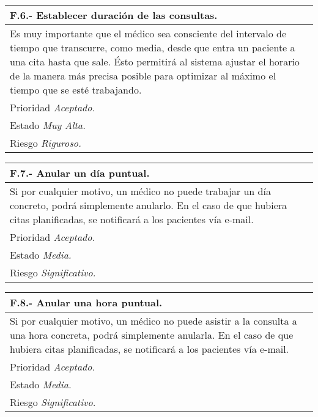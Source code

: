 \documentclass[a4paper,oneside,11pt]{book}
\begin{document}
\begin{center}
\begin{tabulary}{15cm}{|L|}
	\hline
		\bf{F.6.- Establecer duración de las consultas.} \\
	\hline
		Es muy importante que el médico sea consciente del intervalo de tiempo que transcurre, como media, desde que entra un paciente a una cita hasta que sale. Ésto permitirá al sistema ajustar el horario de la manera más precisa posible para optimizar al máximo el tiempo que se esté trabajando. \\
	\hline
		Prioridad \textit{Aceptado.} \\
	\hline
		Estado \textit{Muy Alta.} \\
	\hline
		Riesgo \textit{Riguroso.} \\
	\hline
\end{tabulary}
\end{center}

\begin{center}
\begin{tabulary}{15cm}{|L|}
	\hline
		\bf{F.7.- Anular un día puntual.} \\
	\hline
		Si por cualquier motivo, un médico no puede trabajar un día concreto, podrá simplemente anularlo. En el caso de que hubiera citas planificadas, se notificará a los pacientes vía e-mail. \\
	\hline
		Prioridad \textit{Aceptado.} \\
	\hline
		Estado \textit{Media.} \\
	\hline
		Riesgo \textit{Significativo.} \\
	\hline
\end{tabulary}
\end{center}

\begin{center}
\begin{tabulary}{15cm}{|L|}
	\hline
		\bf{F.8.- Anular una hora puntual.} \\
	\hline
		Si por cualquier motivo, un médico no puede asistir a la consulta a una hora concreta, podrá simplemente anularla. En el caso de que hubiera citas planificadas, se notificará a los pacientes vía e-mail. \\
	\hline
		Prioridad \textit{Aceptado.} \\
	\hline
		Estado \textit{Media.} \\
	\hline
		Riesgo \textit{Significativo.} \\
	\hline
\end{tabulary}
\end{center}
\end{document}
